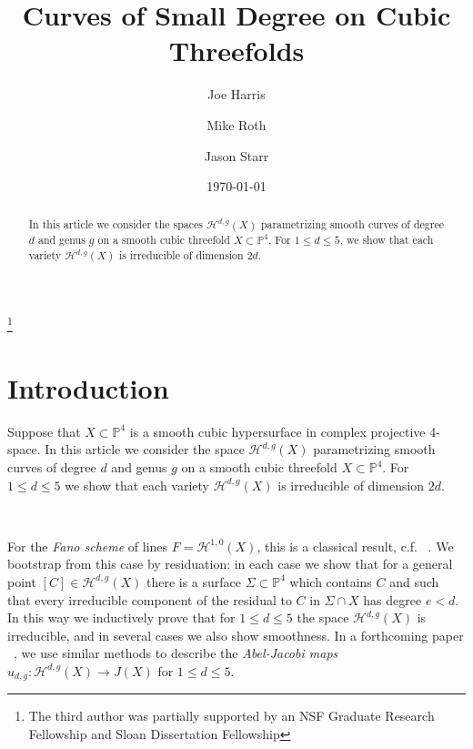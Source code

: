 \documentclass[twoside,12pt,reqno]{amsart}
\theoremstyle{plain}
\theoremstyle{definition}
\newcommand{\Hdg}[2]{\mathcal{H}^{#1,#2}}
\newcommand{\PP}{\mathbb{P}}
\begin{document}
\title{Curves of Small Degree on Cubic Threefolds}
\author[Harris]{Joe Harris} 
\address{Department of Mathematics \\ Harvard University \\ Cambridge MA 02138}
\author[Roth]{Mike Roth} 
\address{Department of Mathematics \\ University of Michigan \\ Ann Arbor, MI 48109}
\author[Starr]{Jason Starr}\thanks{The third author was partially
supported by an NSF 
Graduate Research Fellowship and Sloan Dissertation Fellowship}
\address{Department of Mathematics \\ Massachusetts Institute of Technology \\ Cambridge MA 02139}
\date{\today}

\maketitle

\tableofcontents

\begin{abstract}
In this article we consider the spaces $\Hdg{d}{g}(X)$ parametrizing
smooth curves of degree $d$ and genus $g$ on a smooth cubic threefold $X
\subset \PP^4$.  For $1\leq d\leq 5$, we show that each variety
$\Hdg{d}{g}(X)$ is irreducible of dimension $2d$.  
\end{abstract}

\section{Introduction} \label{sec-intro}

Suppose that $X\subset \PP^4$ is a smooth cubic hypersurface in
complex projective 4-space. In this article we consider the space
$\Hdg{d}{g}(X)$ parametrizing smooth curves of degree $d$ and genus
$g$ on a smooth cubic threefold $X\subset\PP^4$.  For $1\leq d\leq 5$
we show that each variety $\Hdg{d}{g}(X)$ is irreducible of dimension
$2d$.  

\

For the \emph{Fano scheme} of lines $F=\Hdg{1}{0}(X)$, this is a
classical result, c.f. ~\cite{CG}.  We bootstrap from this case by
residuation: in each case we show that for a general point
$[C]\in\Hdg{d}{g}(X)$ there is a surface $\Sigma\subset \PP^4$ which
contains $C$ and such that every irreducible component of the residual 
to $C$ in $\Sigma\cap X$ has degree $e<d$.  In this way we inductively 
prove that for $1\leq d\leq 5$ the space $\Hdg{d}{g}(X)$ is
irreducible, and in several cases we also show smoothness.  In a
forthcoming paper ~\cite{HRS2}, we use similar methods to describe the 
\emph{Abel-Jacobi maps} $u_{d,g}:\Hdg{d}{g}(X)\rightarrow J(X)$ for
$1\leq d\leq 5$.  
\end{document}
